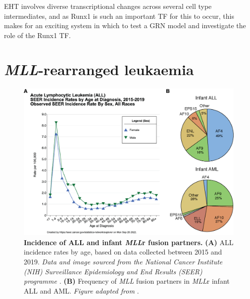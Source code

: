 EHT involves diverse transcriptional changes across several cell type intermediates, and as Runx1 is such an important TF for this to occur, this makes for an exciting system in which to test a GRN model and investigate the role of the Runx1 TF.


\section{\label{ch1:mllr}\textit{MLL}-rearranged leukaemia}

\begin{figure}[!t]
    \centering
    \includegraphics[width=\textwidth,keepaspectratio]{figures/chapter1/ch1_all-incidence.png}
    \caption[{Incidence of ALL and infant \textit{MLL}r fusion partners.}]
    {\textbf{Incidence of ALL and infant \textit{MLL}r fusion partners.} 
    \textbf{(A)} ALL incidence rates by age, based on data collected between 2015 and 2019. \textit{Data and image sourced from the National Cancer Institute (NIH) Surveillance Epidemiology and End Results (SEER) programme \citep{national_cancer_institute_seerexplorer_2022}}. 
    \textbf{(B)} Frequency of \textit{MLL} fusion partners in \textit{MLL}r infant ALL and AML. \textit{Figure adapted from \cite{meyer_mll_2018}}. 
    }
    \label{fig:ch1_all-incidence}
\end{figure}

